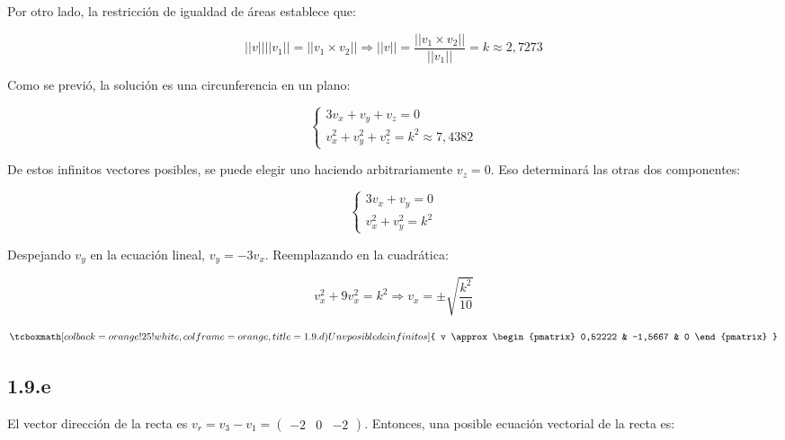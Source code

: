 \documentclass{article}
\begin{document}
Por otro lado, la restricción de igualdad de áreas establece que:

\begin{equation}
||v|| ||v_1|| = ||v_1 \times v_2|| \Rightarrow ||v|| = \frac{||v_1 \times v_2||}{||v_1||} = k \approx 2,7273
\end{equation}

Como se previó, la solución es una circunferencia en un plano:

\begin{equation}
\left\{
\begin{array}{ll}
3 v_x + v_y + v_z = 0 \\
v_x^2 + v_y^2 + v_z^2 = k^2 \approx 7,4382
\end{array}
\right.
\end{equation}

De estos infinitos vectores posibles, se puede elegir uno haciendo arbitrariamente $v_z = 0$. Eso determinará las otras dos componentes:

\begin{equation}
\left\{
\begin{array}{ll}
3 v_x + v_y = 0 \\
v_x^2 + v_y^2 = k^2
\end{array}
\right.
\end{equation}

Despejando $v_y$ en la ecuación lineal, $v_y = -3 v_x$. Reemplazando en la cuadrática:

\begin{equation}
v_x^2 + 9 v_x^2 = k^2 \Rightarrow v_x = \pm \sqrt{\frac{k^2}{10}}
\end{equation}

\begin{equation}
\tcboxmath[colback=orange!25!white,colframe=orange,title=1.9.d) Un v posible de infinitos]
{ v \approx \begin{pmatrix}
0,52222 & -1,5667 & 0
\end{pmatrix} }
\end{equation}

\subsection*{1.9.e}
\label{subsec:1.9.e}

El vector dirección de la recta es $v_r = v_3 - v_1 = \begin{pmatrix} -2 & 0 & -2 \end{pmatrix}$. Entonces, una posible ecuación vectorial de la recta es:
\end{document}
